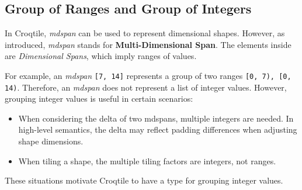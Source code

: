 \subsection*{Group of Ranges and Group of Integers}

In Croqtile, \emph{mdspan} can be used to represent dimensional shapes. However, as introduced, \emph{mdspan} stands for \textbf{Multi-Dimensional Span}. The elements inside are \emph{Dimensional Spans}, which imply ranges of values.

For example, an \emph{mdspan} \texttt{[7, 14]} represents a group of two ranges \texttt{[0, 7), [0, 14)}. Therefore, an \emph{mdspan} does not represent a list of integer values. However, grouping integer values is useful in certain scenarios:

\begin{itemize}[leftmargin=1.6em]
\item When considering the delta of two mdspans, multiple integers are needed. In high-level semantics, the delta may reflect padding differences when adjusting shape dimensions.
\item When tiling a shape, the multiple tiling factors are integers, not ranges.
\end{itemize}

These situations motivate Croqtile to have a type for grouping integer values.
